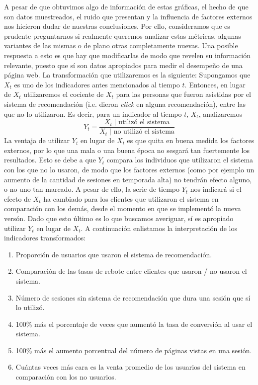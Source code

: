\documentclass[12pt]{report}
\begin{document}
A pesar de que obtuvimos algo de información de estas gráficas, el hecho de que son datos muestreados, el ruido que presentan y la influencia de factores externos nos hicieron dudar de nuestras conclusiones. Por ello, consideramos que es prudente preguntarnos si realmente queremos analizar estas métricas, algunas variantes de las mismas o de plano otras completamente nuevas. Una posible respuesta a esto es que hay que modificarlas de modo que revelen su información relevante, puesto que sí son datos apropiados para medir el desempeño de una página web. La transformación que utilizaremos es la siguiente: Supongamos que $X_t$ es uno de los indicadores antes mencionados al tiempo $t$. Entonces, en lugar de $X_t$ utilizaremos el cociente de $X_t$ para las personas que fueron asistidas por el sistema de recomendación (i.e. dieron \emph{click} en alguna recomendación), entre las que no lo utilizaron. Es decir, para un indicador al tiempo $t$, $X_t$, analizaremos
\[
Y_t = \frac{X_t \; | \text{ utilizó el sistema}}{X_t \; | \text{ no utilizó el sistema}}
\]
La ventaja de utilizar $Y_t$ en lugar de $X_t$ es que quita en buena medida los factores externos, por lo que una mala o una buena época no sesgará tan fuertemente los resultados. Esto se debe a que $Y_t$ compara los individuos que utilizaron el sistema con los que no lo usaron, de modo que los factores externos (como por ejemplo un aumento de la cantidad de sesiones en temporada alta) no tendrán efecto alguno, o no uno tan marcado. A pesar de ello, la serie de tiempo $Y_t$ nos indicará si el efecto de $X_t$ ha cambiado para los clientes que utilizaron el sistema en comparación con los demás, desde el momento en que se implementó la nueva versón. Dado que esto último es lo que buscamos averiguar, sí es apropiado utilizar $Y_t$ en lugar de $X_t$. A continuación enlistamos la interpretación de los indicadores transformados:
\begin{enumerate}
	\item Proporción de usuarios que usaron el sistema de recomendación.
	\item Comparación de las tasas de rebote entre clientes que usaron / no usaron el sistema.
	\item Número de sesiones sin sistema de recomendación que dura una sesión que sí lo utilizó.
	\item 100\% más el porcentaje de veces que aumentó la tasa de conversión al usar el sistema.
	\item 100\% más el aumento porcentual del número de páginas vistas en una sesión.
	\item Cuántas veces más cara es la venta promedio de los usuarios del sistema en comparación con los no usuarios.
\end{enumerate}
\end{document}
